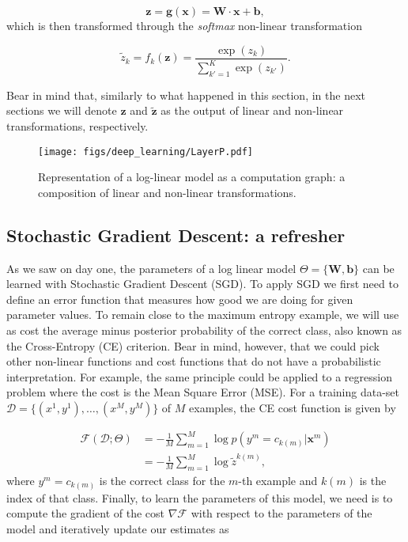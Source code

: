 \begin{equation}
\mathbf{z} = \mathbf{g}(\mathbf{x}) = \mathbf{W} \cdot \mathbf{x} + \mathbf{b},
\label{eq:linear}
\end{equation}
%
which is then transformed through the \textit{softmax} non-linear
transformation

\begin{equation}
\tilde{z}_k = f_k(\mathbf{z}) = \frac{\exp(z_k)}{\sum_{k'=1}^{K} \exp(z_{k'})}.
\label{eq:softmax}
\end{equation}

Bear in mind that, similarly to what happened in this section, in the next sections we will denote $\mathbf{z}$ and
$\tilde{\mathbf{z}}$ as the output of linear and non-linear
transformations, respectively.

\begin{figure}
\centering
\texttt{[image: figs/deep\_learning/LayerP.pdf]}
\caption{Representation of a log-linear model as a computation graph: a
composition of linear and non-linear transformations. }
\label{fig:LayerP}
\end{figure}

\subsection{Stochastic Gradient Descent: a refresher}

As we saw on day one, the parameters of a log linear model
$\Theta=\{\mathbf{W}, \mathbf{b}\}$ can be learned with Stochastic Gradient Descent (SGD). To apply SGD we first need to define an error function that measures how
good we are doing for given parameter values. %
 To remain close to the maximum
entropy example, we will use as cost the average minus posterior probability of
the correct class, also known as the Cross-Entropy (CE) criterion. Bear in
mind, however, that we could pick other non-linear functions and cost functions
that do not have
a probabilistic interpretation. For example, the same principle could be applied to
a regression problem where the cost is the Mean Square Error (MSE).
%
For a training data-set $\mathcal{D} = \{(x^1,y^1), \ldots, (x^M,y^M)\}$ of $M$ examples, the CE cost function is given by

\begin{align}
\mathcal{F}(\mathcal{D};\Theta) 
& = -\frac{1}{M}\sum_{m=1}^{M} \log p(y^m=c_{k(m)} | \mathbf{x}^m) \\
& = -\frac{1}{M}\sum_{m=1}^{M} \log \tilde{{z}}^{k(m)} ,
\label{eq:CostLogPos}
\end{align}
%
where $y^m=c_{k(m)}$ is the correct class for the $m$-th
example and $k(m)$ is the index of that class.
Finally, to learn the parameters of this model, we need is to compute the gradient
of the cost $\nabla\mathcal{F}$ with respect to the parameters of the model and
iteratively update our estimates as 

